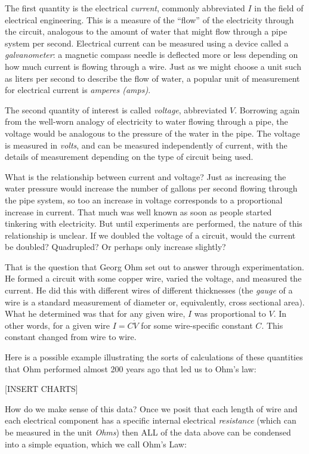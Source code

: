 \documentclass[UTF8]{book}
\begin{document}
\begin{CJK}{UTF8}{gbsn}
The first quantity is the electrical \emph{current}, commonly abbreviated $I$ in the field of electrical engineering. This is a measure of the ``flow'' of the electricity through the circuit, analogous to the amount of water that might flow through a pipe system per second. Electrical current can be measured using a device called a \emph{galvanometer}: a magnetic compass needle is deflected more or less depending on how much current is flowing through a wire. Just as we might choose a unit such as liters per second to describe the flow of water, a popular unit of measurement for electrical current is \emph{amperes (amps)}.

The second quantity of interest is called \emph{voltage}, abbreviated $V$. Borrowing again from the well-worn analogy of electricity to water flowing through a pipe, the voltage would be analogous to the pressure of the water in the pipe. The voltage is measured in \emph{volts}, and can be measured independently of current, with the details of measurement depending on the type of circuit being used.

What is the relationship between current and voltage? Just as increasing the water pressure would increase the number of gallons per second flowing through the pipe system, so too an increase in voltage corresponds to a proportional increase in current. That much was well known as soon as people started tinkering with electricity. But until experiments are performed, the nature of this relationship is unclear. If we doubled the voltage of a circuit, would the current be doubled? Quadrupled? Or perhaps only increase slightly?

That is the question that Georg Ohm set out to answer through experimentation. He formed a circuit with some copper wire, varied the voltage, and measured the current. He did this with different wires of different thicknesses (the \emph{gauge} of a wire is a standard measurement of diameter or, equivalently, cross sectional area). What he determined was that for any given wire, $I$ was proportional to $V$. In other words, for a given wire $I = C \dot V$ for some wire-specific constant $C$. This constant changed from wire to wire.

Here is a possible example illustrating the sorts of calculations of these quantities that Ohm performed almost 200 years ago that led us to Ohm's law:

[INSERT CHARTS]

How do we make sense of this data? Once we posit that each length of wire and each electrical component has a specific internal electrical \emph{resistance} (which can be measured in the unit \emph{Ohms}) then ALL of the data above can be condensed into a simple equation, which we call Ohm's Law:


\end{CJK}
\end{document}
